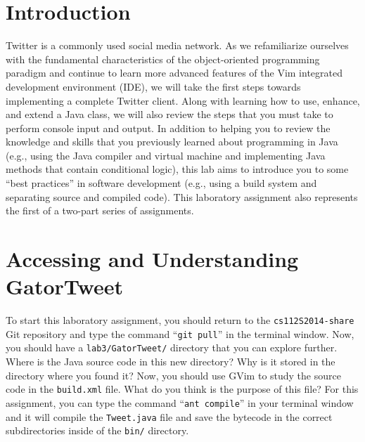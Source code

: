 


\usepackage[compact]{titlesec}


\section*{Introduction}

  Twitter is a commonly used social media network.  As we refamiliarize ourselves with the fundamental characteristics
  of the object-oriented programming paradigm and continue to learn more advanced features of the Vim integrated
  development environment (IDE), we will take the first steps towards implementing a complete Twitter client. Along with
  learning how to use, enhance, and extend a Java class, we will also review the steps that you must take to perform
  console input and output. In addition to helping you to review the knowledge and skills that you previously learned
  about programming in Java (e.g., using the Java compiler and virtual machine and implementing Java methods that
  contain conditional logic), this lab aims to introduce you to some ``best practices'' in software development (e.g.,
using a build system and separating source and compiled code).  This laboratory assignment also represents the first of a
two-part series of assignments. 

\section*{Accessing and Understanding GatorTweet}

  To start this laboratory assignment, you should return to the {\tt cs112S2014-share} Git repository and type the
  command ``{\tt git pull}'' in the terminal window.  Now, you should have a {\tt lab3/GatorTweet/} directory that you
  can explore further.  Where is the Java source code in this new directory? Why is it stored in the directory where you
  found it? Now, you should use GVim to study the source code in the {\tt build.xml} file.  What do you think is the
  purpose of this file?  For this assignment, you can type the command ``{\tt ant compile}'' in your terminal window and
  it will compile the {\tt Tweet.java} file and save the bytecode in the correct subdirectories inside of the {\tt bin/}
  directory. 

